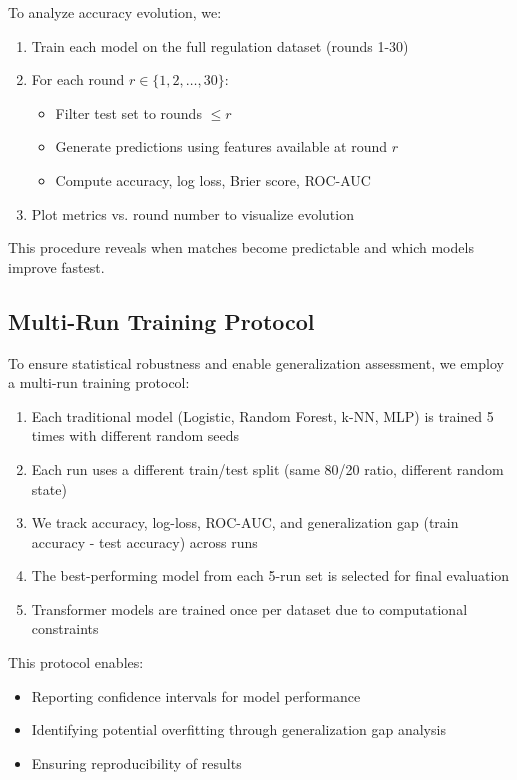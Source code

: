 \documentclass[11pt]{article}
\begin{document}
To analyze accuracy evolution, we:
\begin{enumerate}
    \item Train each model on the full regulation dataset (rounds 1-30)
    \item For each round $r \in \{1, 2, \ldots, 30\}$:
    \begin{itemize}
        \item Filter test set to rounds $\leq r$
        \item Generate predictions using features available at round $r$
        \item Compute accuracy, log loss, Brier score, ROC-AUC
    \end{itemize}
    \item Plot metrics vs. round number to visualize evolution
\end{enumerate}

This procedure reveals when matches become predictable and which models improve fastest.

\subsection{Multi-Run Training Protocol}

To ensure statistical robustness and enable generalization assessment, we employ a multi-run training protocol:
\begin{enumerate}
    \item Each traditional model (Logistic, Random Forest, k-NN, MLP) is trained 5 times with different random seeds
    \item Each run uses a different train/test split (same 80/20 ratio, different random state)
    \item We track accuracy, log-loss, ROC-AUC, and generalization gap (train accuracy - test accuracy) across runs
    \item The best-performing model from each 5-run set is selected for final evaluation
    \item Transformer models are trained once per dataset due to computational constraints
\end{enumerate}

This protocol enables:
\begin{itemize}
    \item Reporting confidence intervals for model performance
    \item Identifying potential overfitting through generalization gap analysis
    \item Ensuring reproducibility of results
\end{itemize}
\end{document}

